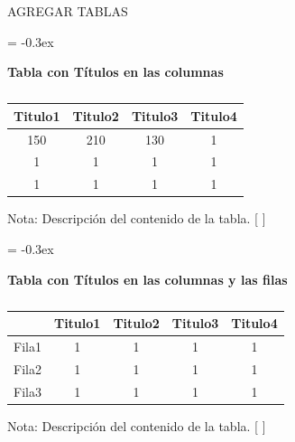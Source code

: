     
    
    AGREGAR TABLAS\par
    {
    \extrarowheight = -0.3ex
    \renewcommand{\arraystretch}{1.8}
    
    \begin{table}[H]
        \centering
        \caption{} \vspace{5mm}
        \textbf{Tabla con Títulos en las columnas} \vspace{7mm}
       
            \begin{tabular}{cccc}
            \hline
            Titulo1 & Titulo2 & Titulo3 & Titulo4  \\
            \hline
                150        & 210       & 130        & 1 \\
                1        & 1        & 1        & 1 \\
                1        & 1        & 1        & 1 \\
            \hline
            \end{tabular}
        \label{TablaI}
    \end{table}}
\setlength{\parskip}{-1mm}
Nota: Descripción del contenido de la tabla. [ ] %
\setlength{\parskip}{2em}

{
\extrarowheight = -0.3ex %
\renewcommand{\arraystretch}{1.8} %
\begin{table}[H]
    \centering
    \caption{} \vspace{5mm}
    \textbf{Tabla con Títulos en las columnas y las filas} \vspace{7mm}
   
        \begin{tabular}{ccccc}
\hline
            & Titulo1 & Titulo2 & Titulo3 & Titulo4  \\
\hline
    Fila1        & 1        & 1        & 1        & 1 \\
    Fila2        & 1        & 1        & 1        & 1 \\
    Fila3        & 1        & 1        & 1        & 1 \\
\hline
        \end{tabular}
    \label{TablaII}
\end{table}}
\setlength{\parskip}{-1mm}
Nota: Descripción del contenido de la tabla. [ ] %
\setlength{\parskip}{2em}

